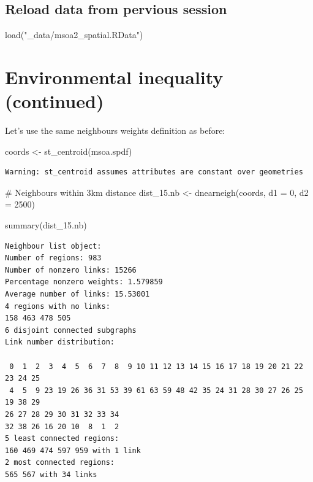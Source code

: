 \documentclass[
  letterpaper,
  DIV=11,
  numbers=noendperiod]{scrreprt}
\newenvironment{Shaded}{\begin{snugshade}}{\end{snugshade}}
\newcommand{\AttributeTok}[1]{\textcolor[rgb]{0.40,0.45,0.13}{#1}}
\newcommand{\CommentTok}[1]{\textcolor[rgb]{0.37,0.37,0.37}{#1}}
\newcommand{\DecValTok}[1]{\textcolor[rgb]{0.68,0.00,0.00}{#1}}
\newcommand{\FunctionTok}[1]{\textcolor[rgb]{0.28,0.35,0.67}{#1}}
\newcommand{\NormalTok}[1]{\textcolor[rgb]{0.00,0.23,0.31}{#1}}
\newcommand{\OtherTok}[1]{\textcolor[rgb]{0.00,0.23,0.31}{#1}}
\newcommand{\StringTok}[1]{\textcolor[rgb]{0.13,0.47,0.30}{#1}}
\begin{document}
\hypertarget{reload-data-from-pervious-session-9}{%
\subsection*{Reload data from pervious
session}\label{reload-data-from-pervious-session-9}}

\begin{Shaded}
\begin{Highlighting}[]
\FunctionTok{load}\NormalTok{(}\StringTok{"\_data/msoa2\_spatial.RData"}\NormalTok{)}
\end{Highlighting}
\end{Shaded}

\hypertarget{environmental-inequality-continued}{%
\section{Environmental inequality
(continued)}\label{environmental-inequality-continued}}

Let's use the same neighbours weights definition as before:

\begin{Shaded}
\begin{Highlighting}[]
\NormalTok{coords }\OtherTok{\textless{}{-}} \FunctionTok{st\_centroid}\NormalTok{(msoa.spdf)}
\end{Highlighting}
\end{Shaded}

\begin{verbatim}
Warning: st_centroid assumes attributes are constant over geometries
\end{verbatim}

\begin{Shaded}
\begin{Highlighting}[]
\CommentTok{\# Neighbours within 3km distance}
\NormalTok{dist\_15.nb }\OtherTok{\textless{}{-}} \FunctionTok{dnearneigh}\NormalTok{(coords, }\AttributeTok{d1 =} \DecValTok{0}\NormalTok{, }\AttributeTok{d2 =} \DecValTok{2500}\NormalTok{)}

\FunctionTok{summary}\NormalTok{(dist\_15.nb)}
\end{Highlighting}
\end{Shaded}

\begin{verbatim}
Neighbour list object:
Number of regions: 983 
Number of nonzero links: 15266 
Percentage nonzero weights: 1.579859 
Average number of links: 15.53001 
4 regions with no links:
158 463 478 505
6 disjoint connected subgraphs
Link number distribution:

 0  1  2  3  4  5  6  7  8  9 10 11 12 13 14 15 16 17 18 19 20 21 22 23 24 25 
 4  5  9 23 19 26 36 31 53 39 61 63 59 48 42 35 24 31 28 30 27 26 25 19 38 29 
26 27 28 29 30 31 32 33 34 
32 38 26 16 20 10  8  1  2 
5 least connected regions:
160 469 474 597 959 with 1 link
2 most connected regions:
565 567 with 34 links
\end{verbatim}
\end{document}
